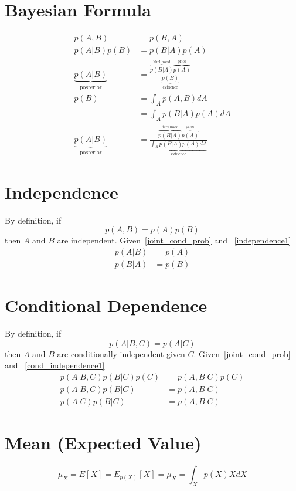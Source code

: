 \documentclass{book}
\numberwithin{equation}{subsection}
\begin{document}
\section{Bayesian Formula}
\begin{align}
    p(A,B) &= p(B,A)\\
    p(A|B)p(B) &= p(B|A)p(A)\\
    \underbrace{p(A|B)}_{\text{posterior}} &= \frac{\overbrace{p(B|A)}^\text{likelihood}\overbrace{p(A)}^\text{prior}}{\underbrace{p(B)}_\text{evidence}}\\
    p(B) &= \int_A p(A,B)dA\\
    &= \int_A p(B|A)p(A)dA\\
    \underbrace{p(A|B)}_{\text{posterior}} &= \frac{\overbrace{p(B|A)}^\text{likelihood}\overbrace{p(A)}^\text{prior}}{\underbrace{\int_A p(B|A)p(A)dA}_\text{evidence}}\label{bayesian}
\end{align}
\section{Independence}
By definition, if
\begin{equation}
    p(A,B) = p(A)p(B) \label{independence1}
\end{equation}
then $A$ and $B$ are independent. Given~\ref{joint_cond_prob} and ~\ref{independence1}
\begin{align}
    p(A|B) &= p(A)\\
    p(B|A) &= p(B)
\end{align}
\section{Conditional Dependence}
By definition, if
\begin{equation}
    p(A|B,C) = p(A|C) \label{cond_independence1}
\end{equation}
then $A$ and $B$ are conditionally independent given $C$.
Given~\ref{joint_cond_prob} and ~\ref{cond_independence1}
\begin{align}
    p(A|B,C)p(B|C)p(C) &= p(A,B|C)p(C)\\
    p(A|B,C)p(B|C) &= p(A,B|C)\\
    p(A|C)p(B|C) &= p(A,B|C) \label{cond_independence2}
\end{align}
\section{Mean (Expected Value)}
\begin{equation}
    \mu_X = E[X] = E_{p(X)}[X] = \mu_X = \int_X p(X)X dX
\end{equation}
\end{document}
